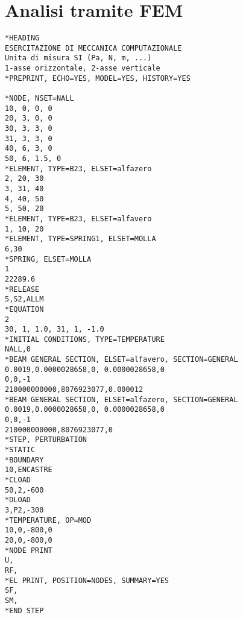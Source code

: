 \section{Analisi tramite FEM}
\begin{lstlisting} 
*HEADING
ESERCITAZIONE DI MECCANICA COMPUTAZIONALE
Unita di misura SI (Pa, N, m, ...)
1-asse orizzontale, 2-asse verticale
*PREPRINT, ECHO=YES, MODEL=YES, HISTORY=YES

*NODE, NSET=NALL
10, 0, 0, 0
20, 3, 0, 0
30, 3, 3, 0
31, 3, 3, 0
40, 6, 3, 0
50, 6, 1.5, 0
*ELEMENT, TYPE=B23, ELSET=alfazero
2, 20, 30
3, 31, 40
4, 40, 50
5, 50, 20
*ELEMENT, TYPE=B23, ELSET=alfavero
1, 10, 20
*ELEMENT, TYPE=SPRING1, ELSET=MOLLA
6,30
*SPRING, ELSET=MOLLA
1
22289.6
*RELEASE
5,S2,ALLM
*EQUATION 
2 
30, 1, 1.0, 31, 1, -1.0
*INITIAL CONDITIONS, TYPE=TEMPERATURE
NALL,0
*BEAM GENERAL SECTION, ELSET=alfavero, SECTION=GENERAL
0.0019,0.0000028658,0, 0.0000028658,0
0,0,-1
210000000000,8076923077,0.000012
*BEAM GENERAL SECTION, ELSET=alfazero, SECTION=GENERAL
0.0019,0.0000028658,0, 0.0000028658,0
0,0,-1
210000000000,8076923077,0
*STEP, PERTURBATION
*STATIC
*BOUNDARY
10,ENCASTRE
*CLOAD
50,2,-600
*DLOAD
3,P2,-300
*TEMPERATURE, OP=MOD
10,0,-800,0
20,0,-800,0
*NODE PRINT
U,
RF,
*EL PRINT, POSITION=NODES, SUMMARY=YES
SF,
SM,
*END STEP
\end{lstlisting}

